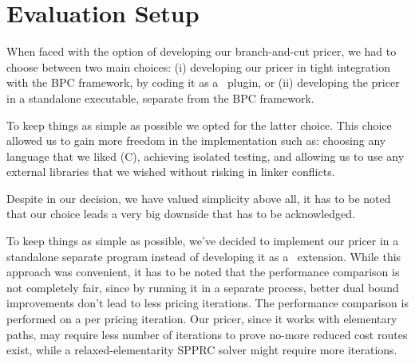 




\begin{comment}

\cite{uchoa2017}
THE CVRPLIB website
The typical instance repository of today is a web page that allows downloading the instance
files and includes additional textual information, like file format description, instance
source, best known/optimal solution values, etc. The CVRLIB web page, where the new
instances (and all the previous CVRP instances described in Section 2) are available
(http://vrp.galgos.inf.puc-rio.br/index.php/en/), is more sophisticated:
\end{comment}


\section{Evaluation Setup}
\label{sec:results-evaluation-setup}

When faced with the option of developing our branch-and-cut pricer,
we had to choose between two main choices:
(i) developing our pricer in tight integration with the BPC framework,
by coding it as a \bapcod\ plugin,
or (ii) developing the pricer in a standalone executable,
separate from the BPC framework.


To keep things as simple as possible we opted for the latter choice.
This choice allowed us to gain more freedom in the implementation
such as: choosing any language that we liked (C),
achieving isolated testing,
and allowing us to use any external libraries
that we wished without risking in linker conflicts.

Despite in our decision, we have valued simplicity above all,
it has to be noted that our choice leads a very big downside that has to be acknowledged.


To keep things as simple as possible, we've decided to implement our
pricer in a standalone separate program instead of developing it as a \bapcod\ extension.
While this approach was convenient, it has to be noted that the performance comparison is not
completely fair, since by running it in a separate process, better dual bound improvements
don't lead to less pricing iterations.
The performance comparison is performed on a per pricing iteration.
Our pricer, since it works with elementary paths, may require less number of iterations
to prove no-more reduced cost routes exist, while a relaxed-elementarity SPPRC solver
might require more iterations.



